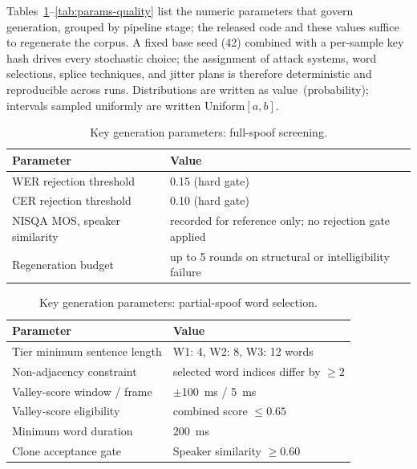 \documentclass[11pt]{report}
\begin{document}
Tables~\ref{tab:params-fullspoof}--\ref{tab:params-quality}
list the numeric parameters that govern generation, grouped by pipeline
stage; the released code and these values suffice to regenerate the
corpus. A fixed base seed (42) combined with a per-sample key hash drives
every stochastic choice; the assignment of attack systems, word
selections, splice techniques, and jitter plans is therefore deterministic and
reproducible across runs. Distributions are written as
value~(probability); intervals sampled uniformly are written
Uniform$[a,b]$.

\begin{table}[H]
\centering
\caption{Key generation parameters: full-spoof screening.}
\label{tab:params-fullspoof}
\small
\begin{tabular}{p{4.9cm}p{7.2cm}}
\toprule
\textbf{Parameter} & \textbf{Value} \\
\midrule
WER rejection threshold & 0.15 (hard gate) \\
CER rejection threshold & 0.10 (hard gate) \\
NISQA MOS, speaker similarity & recorded for reference only; no rejection gate applied \\
Regeneration budget & up to 5 rounds on structural or intelligibility failure \\
\bottomrule
\end{tabular}
\end{table}

\begin{table}[H]
\centering
\caption{Key generation parameters: partial-spoof word selection.}
\label{tab:params-wordselect}
\small
\begin{tabular}{p{4.9cm}p{7.2cm}}
\toprule
\textbf{Parameter} & \textbf{Value} \\
\midrule
Tier minimum sentence length & W1: 4, W2: 8, W3: 12 words \\
Non-adjacency constraint & selected word indices differ by $\geq 2$ \\
Valley-score window / frame & $\pm$\SI{100}{\milli\second} / \SI{5}{\milli\second} \\
Valley-score eligibility & combined score $\leq 0.65$ \\
Minimum word duration & \SI{200}{\milli\second} \\
Clone acceptance gate & Speaker similarity $\geq 0.60$ \\
\bottomrule
\end{tabular}
\end{table}
\end{document}
